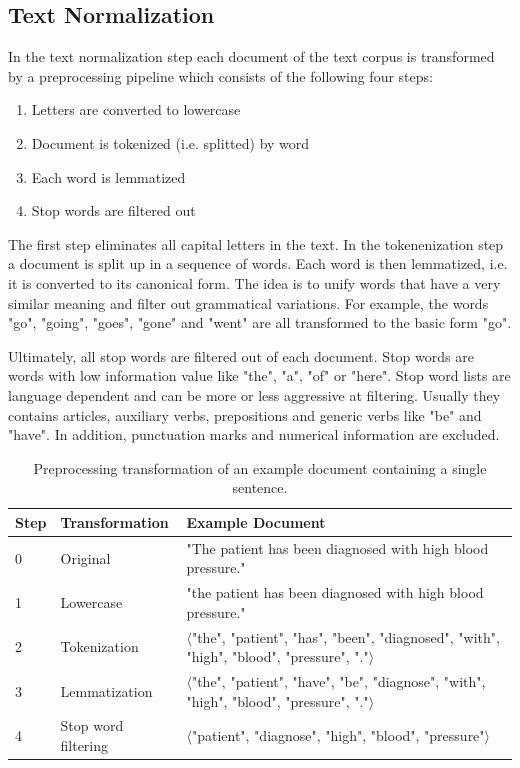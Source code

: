 \subsection{Text Normalization}

In the text normalization step each document of the text corpus is transformed by a preprocessing pipeline which consists of the following four steps:

\begin{enumerate} 
	\item Letters are converted to lowercase
	\item Document is tokenized (i.e. splitted) by word
	\item Each word is lemmatized
	\item Stop words are filtered out
\end{enumerate}

The first step eliminates all capital letters in the text.
In the tokenenization step a document is split up in a sequence of words.
Each word is then lemmatized, i.e. it is converted to its canonical form.
The idea is to unify words that have a very similar meaning and filter out grammatical variations.
For example, the words  "go", "going", "goes", "gone" and "went" are all transformed to the basic form "go".

Ultimately, all stop words are filtered out of each document.
Stop words are words with low information value like "the", "a", "of" or "here".
Stop word lists are language dependent and can be more or less aggressive at filtering.
Usually they contains articles, auxiliary verbs, prepositions and generic verbs like "be" and "have".
In addition, punctuation marks and numerical information are excluded.

\begin{table}[!htbp]
	\begin{tabularx}{\textwidth}{l l p{9.8cm}}
		\toprule
		\textbf{Step} & \textbf{Transformation} & \textbf{Example Document}                                                       \\ \midrule
		0             & Original       & "The patient has been diagnosed with high blood pressure." \\
		1             & Lowercase               & "the patient has been diagnosed with high blood pressure." \\
		2 & Tokenization  & $\langle$"the", "patient", "has", "been", "diagnosed", "with", "high", "blood", "pressure", "."$\rangle$ \\
		3 & Lemmatization & $\langle$"the", "patient", "have", "be", "diagnose", "with", "high", "blood", "pressure", "."$\rangle$  \\
		4             & Stop word filtering     & $\langle$"patient", "diagnose", "high", "blood", "pressure"$\rangle$ \\ \bottomrule
	\end{tabularx}
	\caption[Preprocessing transformation of an example document]{Preprocessing transformation of an example document containing a single sentence.}
	\label{tab:text-preprocessing}
\end{table}


